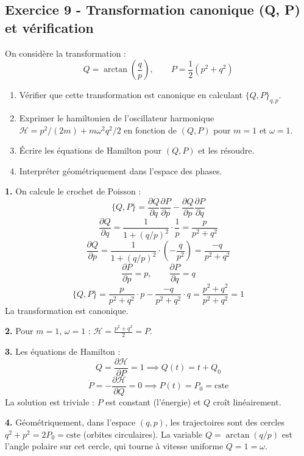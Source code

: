 \documentclass[12pt,a4paper]{article}
\begin{document}
\subsection*{Exercice 9 - Transformation canonique (Q, P) et vérification \niveau{\moyen}}

\begin{boiteexercice}
On considère la transformation :
\[
Q = \arctan\!\left(\frac{q}{p}\right), \qquad P = \frac{1}{2}(p^2+q^2)
\]
\begin{enumerate}
  \item Vérifier que cette transformation est canonique en calculant $\{Q,P\}_{q,p}$.
  \item Exprimer le hamiltonien de l'oscillateur harmonique $\mathcal{H} = p^2/(2m)+m\omega^2 q^2/2$ en fonction de $(Q,P)$ pour $m=1$ et $\omega=1$.
  \item Écrire les équations de Hamilton pour $(Q,P)$ et les résoudre.
  \item Interpréter géométriquement dans l'espace des phases.
\end{enumerate}
\end{boiteexercice}

\begin{boitecorrige}
\textbf{1.} On calcule le crochet de Poisson :
\[
\{Q,P\} = \frac{\partial Q}{\partial q}\frac{\partial P}{\partial p} - \frac{\partial Q}{\partial p}\frac{\partial P}{\partial q}
\]
\[
\frac{\partial Q}{\partial q} = \frac{1}{1+(q/p)^2}\cdot\frac{1}{p} = \frac{p}{p^2+q^2}
\]
\[
\frac{\partial Q}{\partial p} = \frac{1}{1+(q/p)^2}\cdot\left(-\frac{q}{p^2}\right) = \frac{-q}{p^2+q^2}
\]
\[
\frac{\partial P}{\partial p} = p, \qquad \frac{\partial P}{\partial q} = q
\]
\[
\{Q,P\} = \frac{p}{p^2+q^2}\cdot p - \frac{-q}{p^2+q^2}\cdot q = \frac{p^2+q^2}{p^2+q^2} = 1
\]
La transformation est canonique.

\textbf{2.} Pour $m=1$, $\omega=1$ : $\mathcal{H} = \frac{p^2+q^2}{2} = P$.

\textbf{3.} Les équations de Hamilton :
\[
\dot Q = \frac{\partial\mathcal{H}}{\partial P} = 1 \implies Q(t) = t + Q_0
\]
\[
\dot P = -\frac{\partial\mathcal{H}}{\partial Q} = 0 \implies P(t) = P_0 = \text{cste}
\]
La solution est triviale : $P$ est constant (l'énergie) et $Q$ croît linéairement.

\textbf{4.} Géométriquement, dans l'espace $(q,p)$, les trajectoires sont des cercles $q^2+p^2 = 2P_0 = \text{cste}$ (orbites circulaires). La variable $Q = \arctan(q/p)$ est l'angle polaire sur cet cercle, qui tourne à vitesse uniforme $\dot Q = 1 = \omega$.
\end{boitecorrige}
\end{document}
